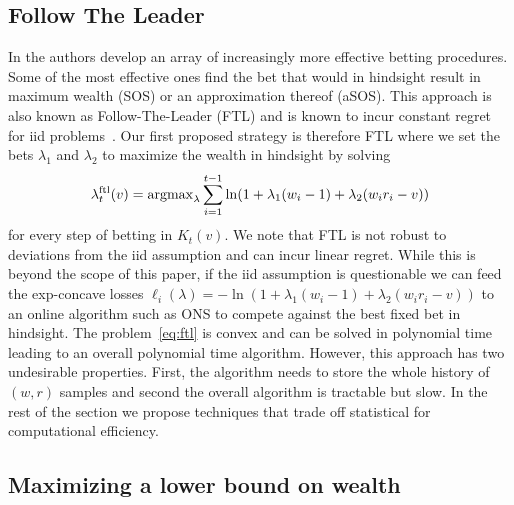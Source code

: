 \subsection{Follow The Leader}
In \cite{waudby-smith_variance-adaptive_2020} the authors develop
an array of increasingly more effective betting procedures. 
Some of the most effective ones find the bet that would in hindsight
result in maximum wealth (SOS) or an approximation thereof (aSOS).
This approach is also known as Follow-The-Leader (FTL) and is 
known to incur constant regret for iid 
problems~\cite{de2014follow}.
Our first proposed strategy 
is therefore FTL where we set the 
bets $\lambda_1$ and $\lambda_2$ to maximize the wealth in hindsight
by solving
\begin{equation}
\lambda_{t}^{\textrm{ftl}}(v) = \operatorname{argmax}_{\lambda} \sum_{i=1}^{t-1} \ln(1+\lambda_1 (w_i-1)+\lambda_2(w_i r_i - v)) \label{eq:ftl}
\end{equation}
for every step of betting in $K_t(v)$. 
We note that FTL is not robust 
to deviations from the iid assumption and 
can incur linear regret. While this is 
beyond the scope of this paper, if 
the iid assumption is questionable we can feed
the exp-concave losses 
$\ell_i(\lambda) = 
-\ln(1+\lambda_{1}(w_i - 1)+\lambda_{2}(w_i r_i - v))$
to an online algorithm such as ONS 
to compete against the best fixed bet in hindsight.
The problem~\eqref{eq:ftl} is convex and can be solved in polynomial time
leading to an overall polynomial time algorithm. However,
this approach has two undesirable properties. First, the 
algorithm needs to store the whole history of $(w,r)$ samples
and second the overall algorithm is tractable but slow.
In the rest of the section we propose techniques that trade off
statistical for computational efficiency.

\subsection{Maximizing a lower bound on wealth}

